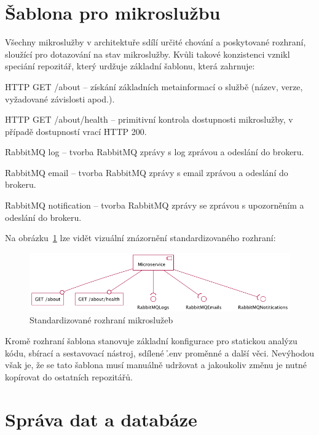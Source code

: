 \section{Šablona pro mikroslužbu}\label{sec:server-template}

Všechny mikroslužby v architektuře sdílí určité chování a poskytované rozhraní, sloužící pro dotazování na stav mikroslužby.
Kvůli takové konzistenci vznikl speciání repozitář, který urdžuje základní šablonu, která zahrnuje:

\begin{ul}
   \item \h{HTTP GET /about} – získání základních metainformací o službě (název, verze, vyžadované závislosti apod.).
   \item \h{HTTP GET /about/health} – primitivní kontrola dostupnosti mikroslužby, v případě dostupností vrací \h{HTTP 200}.
   \item \h{RabbitMQ log} – tvorba RabbitMQ zprávy s log zprávou a odeslání do brokeru.
   \item \h{RabbitMQ email} – tvorba RabbitMQ zprávy s email zprávou a odeslání do brokeru.
   \item \h{RabbitMQ notification} – tvorba RabbitMQ zprávy se zprávou s upozorněním a odeslání do brokeru.
\end{ul}

Na obrázku~\ref{fig:ms-template} lze vidět vizuální znázornění standardizovaného rozhraní:

\begin{figure}[htbp]
   \centering
   \includegraphics[max width=\textwidth]{assets/draft-ms-template}
   \caption{Standardizované rozhraní mikroslužeb}\label{fig:ms-template}
\end{figure}

Kromě rozhraní šablona stanovuje základní konfigurace pro statickou analýzu kódu, sbírací a sestavovací nástroj, sdílené \h{.env} proměnné a další věci.
Nevýhodou však je, že se tato šablona musí manuálně udržovat a jakoukoliv změnu je nutné kopírovat do ostatních repozitářů.



\section{Správa dat a databáze}\label{sec:server-db}

